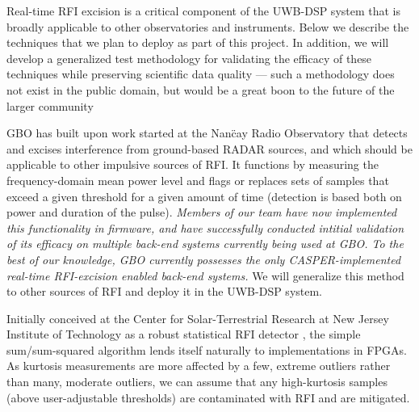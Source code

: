 \documentclass[10pt]{myNSF}
\begin{document}
\label{sec:rfi_excision}

Real-time RFI excision is a critical component of the UWB-DSP system
that is broadly applicable to other observatories and instruments.
Below we describe the techniques that we plan to deploy as part of
this project.  In addition, we will develop a generalized test
methodology for validating the efficacy of these techniques while
preserving scientific data quality --- such a methodology does not
exist in the public domain, but would be a great boon to the future of
the larger community

 GBO has built upon
work started at the Nan\"{c}ay Radio Observatory \citep{dwr17} that
detects and excises interference from ground-based RADAR sources, and
which should be applicable to other impulsive sources of RFI.  It
functions by measuring the frequency-domain mean power level and flags
or replaces sets of samples that exceed a given threshold for a given
amount of time (detection is based both on power and duration of the
pulse).  \emph{Members of our team have now implemented this
  functionality in firmware, and have successfully conducted intitial
  validation of its efficacy on multiple back-end systems currently
  being used at GBO.  To the best of our knowledge, GBO currently
  possesses the only CASPER-implemented real-time RFI-excision enabled
  back-end systems.}  We will generalize this method to other sources
of RFI and deploy it in the UWB-DSP system.

 Initially conceived at the Center for
Solar-Terrestrial Research at New Jersey Institute of Technology as a
robust statistical RFI detector \citep{ng10,nhmg16}, the simple
sum/sum-squared algorithm lends itself naturally to implementations in
FPGAs.  As kurtosis measurements are more affected by a few, extreme
outliers rather than many, moderate outliers, we can assume that any
high-kurtosis samples (above user-adjustable thresholds) are
contaminated with RFI and are mitigated.  
\end{document}
